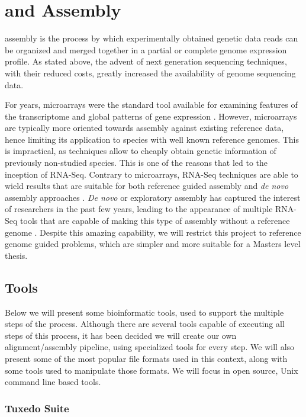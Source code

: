 \section{\rnaseq{} and \Trans{} Assembly}\label{sec:assembly}

\Trans{} assembly is the process by which experimentally obtained genetic data
reads can be organized and merged together in a partial or complete genome
expression profile. As stated above, the advent of next generation sequencing
techniques, with their reduced costs, greatly increased the availability of
genome sequencing data.

For years, microarrays were the standard tool available for examining features
of the transcriptome and global patterns of gene expression \cite{Wolf2013}.
However, microarrays are typically more oriented towards assembly against
existing reference data, hence limiting its application to species with well
known reference genomes. This is impractical, as \ngs{} techniques allow to
cheaply obtain genetic information of previously non-studied species. This is
one of the reasons that led to the inception of RNA-Seq. Contrary to
microarrays, RNA-Seq techniques are able to wield results that are suitable for
both reference guided assembly and \textit{de novo} assembly approaches
\cite{Wilhelm2009}. \textit{De novo} or exploratory assembly has captured the
interest of researchers in the past few years, leading to the appearance of
multiple RNA-Seq tools that are capable of making this type of assembly without
a reference genome \cite{nuno11:assemblathon}. Despite this amazing capability,
we will restrict this project to reference genome guided problems, which are
simpler and more suitable for a Masters level thesis.

\subsection{\rnaseq{} Tools}\label{sec:seqtools}

Below we will present some bioinformatic tools, used to support the multiple
steps of the \rnaseq{} process. Although there are several tools capable of
executing all steps of this process, it has been decided we will create our own
alignment/assembly pipeline, using specialized tools for every step. We will also present
some of the most popular file formats used in this context, along with some
tools used to manipulate those formats. We will focus in open source, Unix
command line based tools.

\subsubsection*{Tuxedo Suite}

